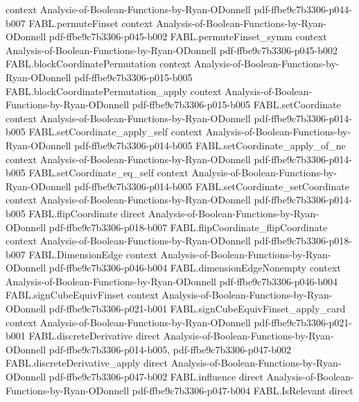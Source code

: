 \begin{theorem}
  {context}
  {Analysis-of-Boolean-Functions-by-Ryan-ODonnell}
  {pdf-ffbe9c7b3306-p044-b007}
\proofstep
  {FABL.permuteFinset}
  {context}
  {Analysis-of-Boolean-Functions-by-Ryan-ODonnell}
  {pdf-ffbe9c7b3306-p045-b002}
\proofstep
  {FABL.permuteFinset_symm}
  {context}
  {Analysis-of-Boolean-Functions-by-Ryan-ODonnell}
  {pdf-ffbe9c7b3306-p045-b002}
\proofstep
  {FABL.blockCoordinatePermutation}
  {context}
  {Analysis-of-Boolean-Functions-by-Ryan-ODonnell}
  {pdf-ffbe9c7b3306-p015-b005}
\proofstep
  {FABL.blockCoordinatePermutation_apply}
  {context}
  {Analysis-of-Boolean-Functions-by-Ryan-ODonnell}
  {pdf-ffbe9c7b3306-p015-b005}
\proofstep
  {FABL.setCoordinate}
  {context}
  {Analysis-of-Boolean-Functions-by-Ryan-ODonnell}
  {pdf-ffbe9c7b3306-p014-b005}
\proofstep
  {FABL.setCoordinate_apply_self}
  {context}
  {Analysis-of-Boolean-Functions-by-Ryan-ODonnell}
  {pdf-ffbe9c7b3306-p014-b005}
\proofstep
  {FABL.setCoordinate_apply_of_ne}
  {context}
  {Analysis-of-Boolean-Functions-by-Ryan-ODonnell}
  {pdf-ffbe9c7b3306-p014-b005}
\proofstep
  {FABL.setCoordinate_eq_self}
  {context}
  {Analysis-of-Boolean-Functions-by-Ryan-ODonnell}
  {pdf-ffbe9c7b3306-p014-b005}
\proofstep
  {FABL.setCoordinate_setCoordinate}
  {context}
  {Analysis-of-Boolean-Functions-by-Ryan-ODonnell}
  {pdf-ffbe9c7b3306-p014-b005}
\proofstep
  {FABL.flipCoordinate}
  {direct}
  {Analysis-of-Boolean-Functions-by-Ryan-ODonnell}
  {pdf-ffbe9c7b3306-p018-b007}
\proofstep
  {FABL.flipCoordinate_flipCoordinate}
  {context}
  {Analysis-of-Boolean-Functions-by-Ryan-ODonnell}
  {pdf-ffbe9c7b3306-p018-b007}
\proofstep
  {FABL.DimensionEdge}
  {context}
  {Analysis-of-Boolean-Functions-by-Ryan-ODonnell}
  {pdf-ffbe9c7b3306-p046-b004}
\proofstep
  {FABL.dimensionEdgeNonempty}
  {context}
  {Analysis-of-Boolean-Functions-by-Ryan-ODonnell}
  {pdf-ffbe9c7b3306-p046-b004}
\proofstep
  {FABL.signCubeEquivFinset}
  {context}
  {Analysis-of-Boolean-Functions-by-Ryan-ODonnell}
  {pdf-ffbe9c7b3306-p021-b001}
\proofstep
  {FABL.signCubeEquivFinset_apply_card}
  {context}
  {Analysis-of-Boolean-Functions-by-Ryan-ODonnell}
  {pdf-ffbe9c7b3306-p021-b001}
\proofstep
  {FABL.discreteDerivative}
  {direct}
  {Analysis-of-Boolean-Functions-by-Ryan-ODonnell}
  {pdf-ffbe9c7b3306-p014-b005,
    pdf-ffbe9c7b3306-p047-b002}
\proofstep
  {FABL.discreteDerivative_apply}
  {direct}
  {Analysis-of-Boolean-Functions-by-Ryan-ODonnell}
  {pdf-ffbe9c7b3306-p047-b002}
\proofstep
  {FABL.influence}
  {direct}
  {Analysis-of-Boolean-Functions-by-Ryan-ODonnell}
  {pdf-ffbe9c7b3306-p047-b004}
\proofstep
  {FABL.IsRelevant}
  {direct}

\end{theorem}
